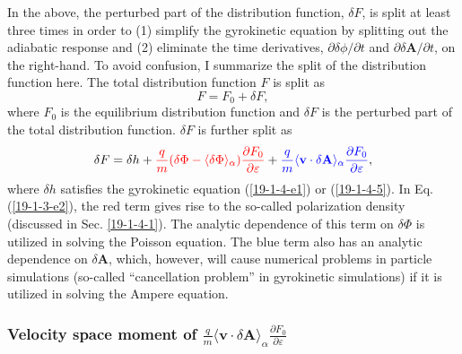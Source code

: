 \documentclass{article}
\newcommand{\tmcolor}[2]{{\color{#1}{#2}}}
\begin{document}
In the above, the perturbed part of the distribution function, $\delta F$, is
split at least three times in order to (1) simplify the gyrokinetic equation
by splitting out the adiabatic response and (2) eliminate the time
derivatives, $\partial \delta \phi / \partial t$ and $\partial \delta
\mathbf{A}/ \partial t$, on the right-hand. To avoid confusion, I summarize
the split of the distribution function here. The total distribution function
$F$ is split as
\begin{equation}
  \label{19-1-4-6} F = F_0 + \delta F,
\end{equation}
where $F_0$ is the equilibrium distribution function and $\delta F$ is the
perturbed part of the total distribution function. $\delta F$ is further split
as
\begin{equation}
  \label{19-1-3-e2} \delta F = \delta h + \tmcolor{red}{\frac{q}{m} (\delta
  \Phi - \langle \delta \Phi \rangle_{\alpha}) \frac{\partial F_0}{\partial
  \varepsilon}} + \tmcolor{blue}{\frac{q}{m} \langle \mathbf{v} \cdot \delta
  \mathbf{A} \rangle_{\alpha} \frac{\partial F_0}{\partial \varepsilon}},
\end{equation}
where $\delta h$ satisfies the gyrokinetic equation (\ref{19-1-4-e1}) or
(\ref{19-1-4-5}). In Eq. (\ref{19-1-3-e2}), the red term gives rise to the
so-called polarization density (discussed in Sec. \ref{19-1-4-1}). The
analytic dependence of this term on $\delta \Phi$ is utilized in solving the
Poisson equation. The blue term also has an analytic dependence on $\delta
\mathbf{A}$, which, however, will cause numerical problems in particle
simulations (so-called ``cancellation problem'' in gyrokinetic simulations) if
it is utilized in solving the Ampere equation.

\subsubsection{Velocity space moment of $\frac{q}{m} \langle \mathbf{v} \cdot
\delta \mathbf{A} \rangle_{\alpha} \frac{\partial F_0}{\partial \varepsilon}$}
\end{document}
